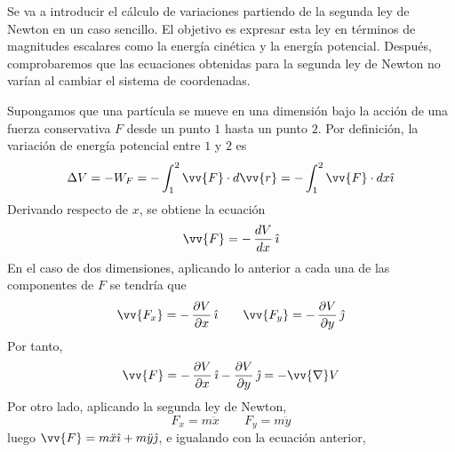 \documentclass[12pt]{report}
\begin{document}
\vspace{2mm}
Se va a introducir el cálculo de variaciones partiendo de la segunda ley de Newton en un caso sencillo. El objetivo es expresar esta ley en términos de magnitudes escalares como la energía cinética y la energía potencial. Después, comprobaremos que las ecuaciones obtenidas para la segunda ley de Newton no varían al cambiar el sistema de coordenadas. 

\vspace{2mm}
Supongamos que una partícula se mueve en una dimensión bajo la acción de una fuerza conservativa $F$ desde un punto $1$ hasta un punto $2$. Por definición, la variación de energía potencial entre $1$ y $2$ es
\[\Delta V = -W_F = -\int_1^2 \vv{F} \cdot d\vv{r} = -\int_1^2 \vv{F} \cdot dx\hat{\imath}\]
Derivando respecto de $x$, se obtiene la ecuación
\[\vv{F} = - \, \frac{dV}{dx} \, \hat{\imath}\]
En el caso de dos dimensiones, aplicando lo anterior a cada una de las componentes de $F$ se tendría que
\[\vv{F_x}=- \, \frac{\partial V}{\partial x} \, \hat{\imath} \qquad \vv{F_y}=- \, \frac{\partial V}{\partial y} 
 \, \hat{\jmath}\]
Por tanto,
\[\vv{F} = - \, \frac{\partial V}{\partial x} \, \hat{\imath} - \frac{\partial V}{\partial y} \, \hat{\jmath} = -\vv{\nabla}V\]
Por otro lado, aplicando la segunda ley de Newton, 
\[F_x = m\ddot{x} \qquad F_y = m\ddot{y}\]
luego $\vv{F} = m\ddot{x}\hat{\imath} + m\ddot{y}\hat{\jmath}$, e igualando con la ecuación anterior,
\end{document}

